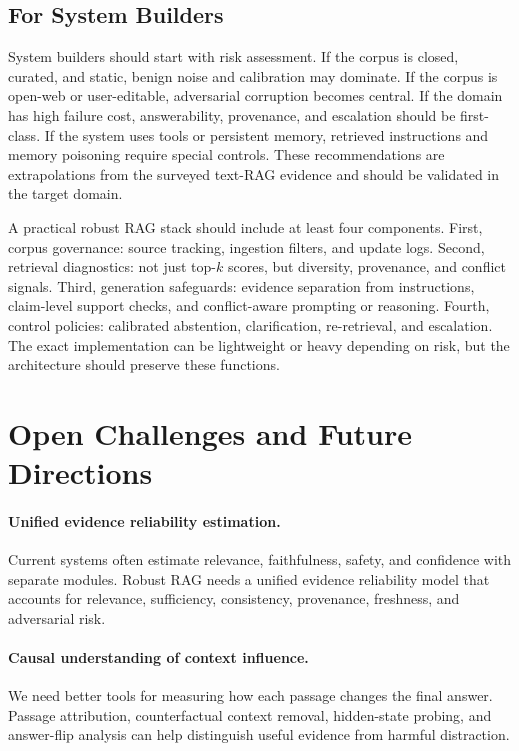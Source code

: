 \documentclass[11pt]{article}
\begin{document}
\subsection{For System Builders}

System builders should start with risk assessment. If the corpus is closed, curated, and static, benign noise and calibration may dominate. If the corpus is open-web or user-editable, adversarial corruption becomes central. If the domain has high failure cost, answerability, provenance, and escalation should be first-class. If the system uses tools or persistent memory, retrieved instructions and memory poisoning require special controls. These recommendations are extrapolations from the surveyed text-RAG evidence and should be validated in the target domain.

A practical robust RAG stack should include at least four components. First, corpus governance: source tracking, ingestion filters, and update logs. Second, retrieval diagnostics: not just top-$k$ scores, but diversity, provenance, and conflict signals. Third, generation safeguards: evidence separation from instructions, claim-level support checks, and conflict-aware prompting or reasoning. Fourth, control policies: calibrated abstention, clarification, re-retrieval, and escalation. The exact implementation can be lightweight or heavy depending on risk, but the architecture should preserve these functions.

\section{Open Challenges and Future Directions}
\label{sec:future}

\paragraph{Unified evidence reliability estimation.}
Current systems often estimate relevance, faithfulness, safety, and confidence with separate modules. Robust RAG needs a unified evidence reliability model that accounts for relevance, sufficiency, consistency, provenance, freshness, and adversarial risk.

\paragraph{Causal understanding of context influence.}
We need better tools for measuring how each passage changes the final answer. Passage attribution, counterfactual context removal, hidden-state probing, and answer-flip analysis can help distinguish useful evidence from harmful distraction.
\end{document}
